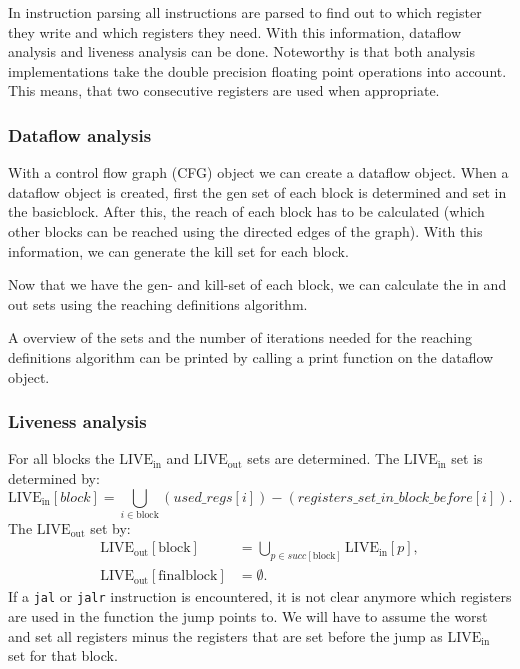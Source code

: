 In instruction parsing all instructions are parsed to find out to which
register they write and which registers they need. With this information,
dataflow analysis and liveness analysis can be done. Noteworthy is that both
analysis implementations take the double precision floating point 
operations into account. This means, that two consecutive registers are used when 
appropriate.
\subsubsection{Dataflow analysis}
With a control flow graph (CFG) object we can create a dataflow object. When a 
dataflow object is created, first the gen set of each block is determined and 
set in the basicblock. After this, the reach of each block has to be calculated
(which other blocks can be reached using the directed edges of the graph). With 
this information, we can generate the kill set for each block.

Now that we have the gen- and kill-set of each block, we can calculate the
in and out sets using the reaching definitions algorithm.

A overview of the sets and the number of iterations needed for the reaching 
definitions algorithm can be printed by calling a print function on the dataflow
object.
\subsubsection{Liveness analysis}
For all blocks the $\text{LIVE}_\text{in}$ and $\text{LIVE}_\text{out}$ sets are determined.
The $\text{LIVE}_\text{in}$ set is determined by:
\[
\text{LIVE}_\text{in}[block] = \bigcup_{i \in \text{block}}(used\_regs[i]) - (registers\_set\_in\_block\_before[i]).
\]
The $\text{LIVE}_\text{out}$ set by:
\begin{align*}
\text{LIVE}_\text{out}[\text{block}]		&= \bigcup_{p \in succ[\text{block}]} \text{LIVE}_\text{in}[p],\\
\text{LIVE}_\text{out}[\text{finalblock}]	&= \emptyset.
\end{align*}
If a \texttt{jal} or \texttt{jalr} instruction is encountered, it is not clear 
anymore which registers are used in the function the jump points to. We will 
have to assume the worst and set all registers minus the registers that
are set before the jump as $\text{LIVE}_\text{in}$ set for that block.
